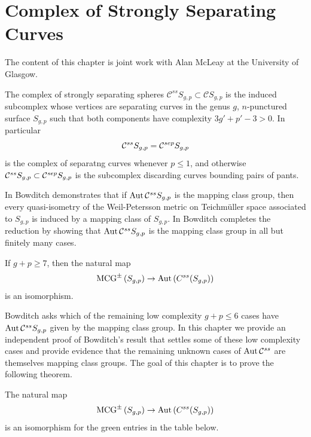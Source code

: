 \chapter{Complex of Strongly Separating Curves}
\label{chap:strongsep}

The content of this chapter is joint work with Alan McLeay at the University of Glasgow.

The complex of strongly separating spheres $\mathcal C^{ss}S_{g,p} \subset \mathcal C S_{g,p}$ is the induced subcomplex
whose vertices are
separating curves in the genus $g$, $n$-punctured surface $S_{g,p}$
such that both components have complexity $3g'+p'-3 > 0$.
In particular
$$
 \mathcal C^{{ss}}  S_{g,p} =  \mathcal C^{{sep}}  S_{g,p}
$$
is the complex of separatng curves whenever $p \leq 1$,
and otherwise $
 \mathcal C^{{ss}}  S_{g,p} \subset  \mathcal C^{{sep}}  S_{g,p}
$
is the subcomplex discarding curves bounding pairs of pants.

In
\cite{MR3724237,MR3620458}
Bowditch demonstrates that if $\operatorname{Aut}  \mathcal C^{{ss}}  S_{g,p}$ is the mapping class group,
then
 every quasi-isometry of the
Weil-Petersson metric on Teichm\"uller space associated to $S_{g,p}$
is induced by a mapping class of $S_{g,p}$.
In \cite{bowditch} Bowditch completes the reduction by showing that
$\operatorname{Aut}  \mathcal C^{{ss}}  S_{g,p}$ is the mapping class group in all but finitely many cases.


\begin{theorem}
  \label{thm:bowditch}
 If $g+p\geq 7$, then
 the natural map
 $$\operatorname{MCG}^\pm \left ( S_{g,p} \right ) \to \operatorname{Aut} \left ( C^{ss}(S_{g,p}) \right )$$
 is an isomorphism.
\end{theorem}

Bowditch asks which of the remaining low complexity $g+p \leq 6$ cases have $\operatorname{Aut}  \mathcal C^{{ss}}  S_{g,p}$ given by the mapping class group.
In this chapter we provide an independent proof of Bowditch's result that settles some of these low complexity cases and
 provide evidence that the remaining unknown cases of $\operatorname{Aut}  \mathcal C^{{ss}} $ are themselves mapping class groups.
The goal of this chapter is to prove the following theorem.

\begin{theorem}
  \label{thm:css}
The natural map
 $$\operatorname{MCG}^\pm \left ( S_{g,p} \right ) \to \operatorname{Aut} \left ( C^{ss}(S_{g,p}) \right )$$
 is an isomorphism for the green entries in the table below.
\end{theorem}


